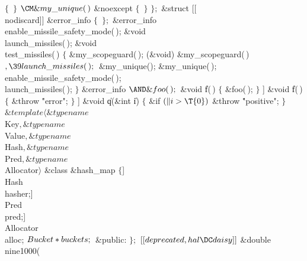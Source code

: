${}\{{}$\C{ \dots }\6
\,${}\}{}$\7
${}\CM\&{my\_unique}(\,){}$ \&{noexcept}\1\1\2\2\6
${}\{{}$\C{ \dots }\6
\,${}\}{}$\C{ \dots }\2\6
${}\};{}$\6
\&{struct} [[\\{nodiscard}]] \&{error\_info} ${}\{{}$\C{ \dots }\6
\,${}\};{}$\6
\&{error\_info} \\{enable\_missile\_safety\_mode}(\,);\6
\&{void} \\{launch\_missiles}(\,);\7
\1\1\&{void} \\{test\_missiles}(\,)\2\2\6
${}\{{}$\1\6
\&{my\_scopeguard}(\,);\6
(\&{void}) \&{my\_scopeguard}(\,)${},\39\\{launch\_missiles}(\,);{}$\6
\&{my\_unique}();\6
\&{my\_unique}(\,);\6
\\{enable\_missile\_safety\_mode}(\,);\6
\\{launch\_missiles}(\,);\6
\4${}\}{}$\2\7
\&{error\_info} ${}{\AND}\&{foo}(\,);{}$\7
\1\1\&{void} \|f(\,)\2\2\6
${}\{{}$\1\6
\&{foo}(\,);\6
\4${}\}{}$\2\7
\1\1[[\\{noreturn}]] \&{void} \|f(\,)\2\2\6
${}\{{}$\1\6
\&{throw} \.{"error"};\6
\4${}\}{}$\2\7
\1\1[[\\{noreturn}]] \&{void} \|q(\&{int} \|i)\2\2\6
${}\{{}$\1\6
\&{if} ${}(\|i>\T{0}){}$\1\5
\&{throw} \.{"positive"};\2\6
\4${}\}{}$\2\7
${}\&{template}\langle\&{typename}{}$ \\{Key}${},\&{typename}{}$ \\{Value}${},%
\&{typename}{}$ \\{Hash}${},\&{typename}{}$ \\{Pred}${},\&{typename}{}$ %
\\{Allocator}${}\rangle{}$ \&{class} \&{hash\_map} ${}\{{}$\1\6
[[\\{no\_unique\_address}]] \\{Hash}\\{hasher};\6
[[\\{no\_unique\_address}]] \\{Pred}\\{pred};\6
[[\\{no\_unique\_address}]] \\{Allocator}\\{alloc};\6
${}\\{Bucket}*\\{buckets};{}$\7
\&{public}:\2\6
${}\};{}$\6
${}[[\\{deprecated},\\{hal}\DC\\{daisy}]]{}$ \&{double} \\{nine1000}(%
